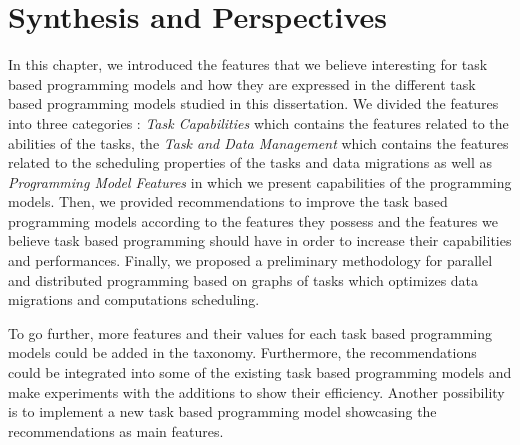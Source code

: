 \section{Synthesis and Perspectives}
In this chapter, we introduced the features that we believe interesting for task based programming models and how they are expressed in the different task based programming models studied in this dissertation.
We divided the features into three categories : \textit{Task Capabilities} which contains the features related to the abilities of the tasks, the \textit{Task and Data Management} which contains the features related to the scheduling properties of the tasks and data migrations as well as \textit{Programming Model Features} in which we present capabilities of the programming models.
Then, we provided recommendations to improve the task based programming models according to the features they possess and the features we believe task based programming should have in order to increase their capabilities and performances.
Finally, we proposed a preliminary methodology for parallel and distributed programming based on graphs of tasks which optimizes data migrations and computations scheduling.

To go further, more features and their values for each task based programming models could be added in the taxonomy.
Furthermore, the recommendations could be integrated into some of the existing task based programming models and make experiments with the additions to show their efficiency.
Another possibility is to implement a new task based programming model showcasing the recommendations as main features.
